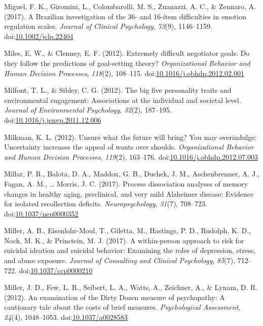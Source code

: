\documentclass[english,man]{apa6}
\begin{document}
\hypertarget{ref-Miguel2017}{}
Miguel, F. K., Giromini, L., Colombarolli, M. S., Zuanazzi, A. C., \&
Zennaro, A. (2017). A Brazilian investigation of the 36- and 16-item
difficulties in emotion regulation scales. \emph{Journal of Clinical
Psychology}, \emph{73}(9), 1146--1159.
doi:\href{https://doi.org/10.1002/jclp.22404}{10.1002/jclp.22404}

\hypertarget{ref-Miles2012}{}
Miles, E. W., \& Clenney, E. F. (2012). Extremely difficult negotiator
goals: Do they follow the predictions of goal-setting theory?
\emph{Organizational Behavior and Human Decision Processes},
\emph{118}(2), 108--115.
doi:\href{https://doi.org/10.1016/j.obhdp.2012.02.001}{10.1016/j.obhdp.2012.02.001}

\hypertarget{ref-Milfont2012}{}
Milfont, T. L., \& Sibley, C. G. (2012). The big five personality traits
and environmental engagement: Associations at the individual and
societal level. \emph{Journal of Environmental Psychology},
\emph{32}(2), 187--195.
doi:\href{https://doi.org/10.1016/j.jenvp.2011.12.006}{10.1016/j.jenvp.2011.12.006}

\hypertarget{ref-Milkman2012}{}
Milkman, K. L. (2012). Unsure what the future will bring? You may
overindulge: Uncertainty increases the appeal of wants over shoulds.
\emph{Organizational Behavior and Human Decision Processes},
\emph{119}(2), 163--176.
doi:\href{https://doi.org/10.1016/j.obhdp.2012.07.003}{10.1016/j.obhdp.2012.07.003}

\hypertarget{ref-Millar2017}{}
Millar, P. R., Balota, D. A., Maddox, G. B., Duchek, J. M.,
Aschenbrenner, A. J., Fagan, A. M., \ldots{} Morris, J. C. (2017).
Process dissociation analyses of memory changes in healthy aging,
preclinical, and very mild Alzheimer disease: Evidence for isolated
recollection deficits. \emph{Neuropsychology}, \emph{31}(7), 708--723.
doi:\href{https://doi.org/10.1037/neu0000352}{10.1037/neu0000352}

\hypertarget{ref-Miller2017}{}
Miller, A. B., Eisenlohr-Moul, T., Giletta, M., Hastings, P. D.,
Rudolph, K. D., Nock, M. K., \& Prinstein, M. J. (2017). A within-person
approach to risk for suicidal ideation and suicidal behavior: Examining
the roles of depression, stress, and abuse exposure. \emph{Journal of
Consulting and Clinical Psychology}, \emph{85}(7), 712--722.
doi:\href{https://doi.org/10.1037/ccp0000210}{10.1037/ccp0000210}

\hypertarget{ref-Miller2012a}{}
Miller, J. D., Few, L. R., Seibert, L. A., Watts, A., Zeichner, A., \&
Lynam, D. R. (2012). An examination of the Dirty Dozen measure of
psychopathy: A cautionary tale about the costs of brief measures.
\emph{Psychological Assessment}, \emph{24}(4), 1048--1053.
doi:\href{https://doi.org/10.1037/a0028583}{10.1037/a0028583}
\end{document}
